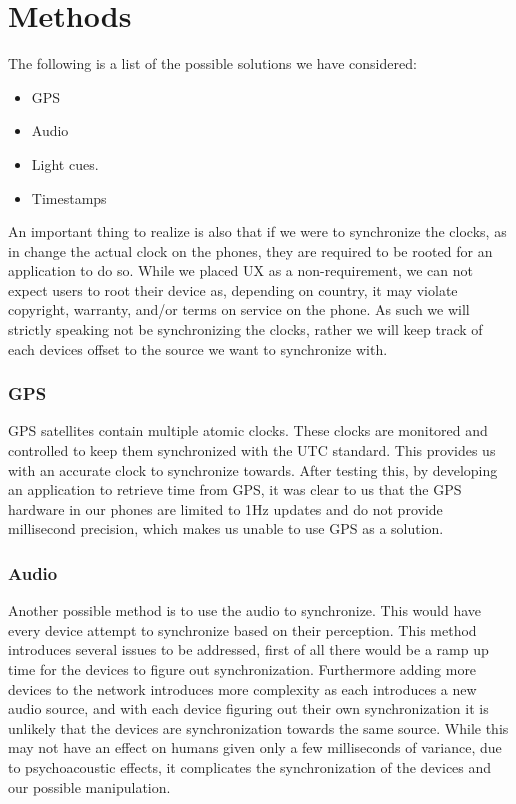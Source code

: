 \section{Methods}
The following is a list of the possible solutions we have considered:
\begin{itemize}
    \item GPS
    \item Audio
    \item Light cues.
    \item Timestamps
\end{itemize}
An important thing to realize is also that if we were to synchronize the clocks, as in change the actual clock on the phones, they are required to be rooted for an application to do so.
While we placed \ac{UX} as a non-requirement, we can not expect users to root their device as, depending on country, it may violate copyright, warranty, and/or terms on service on the phone.
As such we will strictly speaking not be synchronizing the clocks, rather we will keep track of each devices offset to the source we want to synchronize with.

\subsubsection{GPS}
GPS satellites contain multiple atomic clocks.
These clocks are monitored and controlled to keep them synchronized with the UTC standard.
This provides us with an accurate clock to synchronize towards.
After testing this, by developing an application to retrieve time from GPS, it was clear to us that the GPS hardware in our phones are limited to 1Hz updates and do not provide millisecond precision, which makes us unable to use GPS as a solution.

\subsubsection{Audio}
Another possible method is to use the audio to synchronize.
This would have every device attempt to synchronize based on their perception.
This method introduces several issues to be addressed, first of all there would be a ramp up time for the devices to figure out synchronization.
Furthermore adding more devices to the network introduces more complexity as each introduces a new audio source, and with each device figuring out their own synchronization it is unlikely that the devices are synchronization towards the same source.
While this may not have an effect on humans given only a few milliseconds of variance, due to psychoacoustic effects, it complicates the synchronization of the devices and our possible manipulation.

